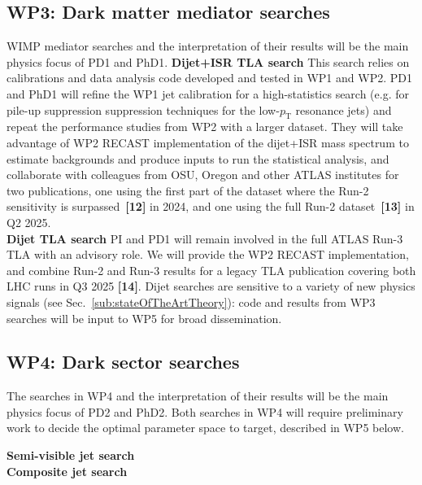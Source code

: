 \subsection{WP3: Dark matter mediator searches}

WIMP mediator searches and the interpretation of their results will be the main physics focus of PD1 and PhD1.
\textbf{Dijet+ISR TLA search} This search relies on calibrations and data analysis code developed and tested in WP1 and WP2.
PD1 and PhD1 will refine the WP1 jet calibration for a high-statistics search (e.g. for pile-up suppression suppression techniques for the low-$p_{\mathrm{T}}$ resonance jets) and repeat the performance studies from WP2 with a larger dataset. 
They will take advantage of WP2 RECAST implementation of the dijet+ISR mass spectrum to estimate backgrounds and produce inputs to run the statistical analysis,
and collaborate with colleagues from OSU, Oregon and other ATLAS institutes for two publications, one using the first part of the dataset where the Run-2 sensitivity is surpassed~\textbf{[12]} in 2024, and one using the full Run-2 dataset~\textbf{[13]} in Q2 2025.\\ 
\textbf{Dijet TLA search} PI and PD1 will remain involved in the full ATLAS Run-3 TLA with an advisory role. 
We will provide the WP2 RECAST implementation, and combine Run-2 and Run-3 results for a legacy TLA publication covering both LHC runs in Q3 2025 \textbf{[14]}. 
Dijet searches are sensitive to a variety of new physics signals (see Sec.~\ref{sub:stateOfTheArtTheory}): code and results from WP3 searches will be input to WP5 for broad dissemination. 

\subsection{WP4: Dark sector searches}

The searches in WP4 and the interpretation of their results will be the main physics focus of PD2 and PhD2. 
Both searches in WP4 will require preliminary work to decide the optimal parameter space to target, described in WP5 below. 

\textbf{Semi-visible jet search}  \\

\textbf{Composite jet search} 



